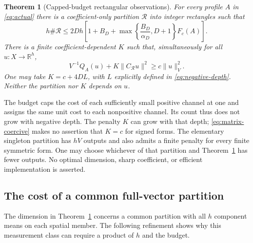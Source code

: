 \documentclass[11pt]{article}
\newtheorem{theorem}{Theorem}[section]
\newcommand{\R}{\mathbb R}
\newcommand{\normn}[1]{\|#1\|_{V}}
\begin{document}
\begin{theorem}[Capped-budget rectangular observations]\label{thm:matrix}
For every profile $A$ in \eqref{eq:actual} there is a coefficient-only
partition $\mathcal R$ into integer rectangles such that
\begin{equation}\label{eq:matrix-count}
 h\#\mathcal R\le
 2Dh\left[1+B_D+
       \max\left\{\frac{B_D}{\alpha_D},D+1\right\}F_c(A)\right].
\end{equation}
There is a finite coefficient-dependent $K$ such that, simultaneously for all
$u:X\to\R^h$,
\begin{equation}\label{eq:matrix-coercive}
 V^{-1}Q_A(u)+K\|C_{\mathcal R}u\|^2\ge c\normn{u}^2.
\end{equation}
One may take $K=c+4DL$, with $L$ explicitly defined in
\eqref{eq:negative-depth}. Neither the partition nor $K$ depends on $u$.
\end{theorem}

The budget caps the cost of each sufficiently small positive channel at one
and assigns the same unit cost to each nonpositive channel. Its count thus
does not grow with negative depth. The penalty $K$ can grow with that depth;
\eqref{eq:matrix-coercive} makes no assertion that $K=c$ for signed forms.
The elementary singleton partition has $hV$ outputs and also admits a finite
penalty for every finite symmetric form. One may choose whichever of that
partition and Theorem~\ref{thm:matrix} has fewer outputs. No optimal dimension,
sharp coefficient, or efficient implementation is asserted.

\subsection{The cost of a common full-vector partition}
The dimension in Theorem~\ref{thm:matrix} concerns a common partition with
all $h$ component means on each spatial member. The following refinement
shows why this measurement class can require a product of $h$ and the budget.
\end{document}
